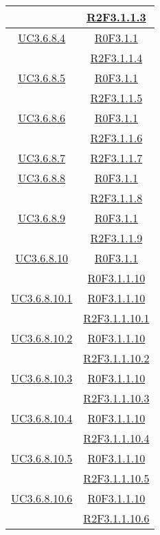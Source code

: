 \begin{longtable}{|c|c|}
& \hyperlink{R2F3.1.1.3}{R2F3.1.1.3}\\
\hline
\hyperlink{UC3.6.8.4}{UC3.6.8.4} & \hyperlink{R0F3.1.1}{R0F3.1.1}\\
& \hyperlink{R2F3.1.1.4}{R2F3.1.1.4}\\
\hline
\hyperlink{UC3.6.8.5}{UC3.6.8.5} & \hyperlink{R0F3.1.1}{R0F3.1.1}\\
& \hyperlink{R2F3.1.1.5}{R2F3.1.1.5}\\
\hline
\hyperlink{UC3.6.8.6}{UC3.6.8.6} & \hyperlink{R0F3.1.1}{R0F3.1.1}\\
& \hyperlink{R2F3.1.1.6}{R2F3.1.1.6}\\
\hline
\hyperlink{UC3.6.8.7}{UC3.6.8.7} & \hyperlink{R2F3.1.1.7}{R2F3.1.1.7}\\
\hline
\hyperlink{UC3.6.8.8}{UC3.6.8.8} & \hyperlink{R0F3.1.1}{R0F3.1.1}\\
& \hyperlink{R2F3.1.1.8}{R2F3.1.1.8}\\
\hline
\hyperlink{UC3.6.8.9}{UC3.6.8.9} & \hyperlink{R0F3.1.1}{R0F3.1.1}\\
& \hyperlink{R2F3.1.1.9}{R2F3.1.1.9}\\
\hline
\hyperlink{UC3.6.8.10}{UC3.6.8.10} & \hyperlink{R0F3.1.1}{R0F3.1.1}\\
& \hyperlink{R0F3.1.1.10}{R0F3.1.1.10}\\
\hline
\hyperlink{UC3.6.8.10.1}{UC3.6.8.10.1} & \hyperlink{R0F3.1.1.10}{R0F3.1.1.10}\\
& \hyperlink{R2F3.1.1.10.1}{R2F3.1.1.10.1}\\
\hline
\hyperlink{UC3.6.8.10.2}{UC3.6.8.10.2} & \hyperlink{R0F3.1.1.10}{R0F3.1.1.10}\\
& \hyperlink{R2F3.1.1.10.2}{R2F3.1.1.10.2}\\
\hline
\hyperlink{UC3.6.8.10.3}{UC3.6.8.10.3} & \hyperlink{R0F3.1.1.10}{R0F3.1.1.10}\\
& \hyperlink{R2F3.1.1.10.3}{R2F3.1.1.10.3}\\
\hline
\hyperlink{UC3.6.8.10.4}{UC3.6.8.10.4} & \hyperlink{R0F3.1.1.10}{R0F3.1.1.10}\\
& \hyperlink{R2F3.1.1.10.4}{R2F3.1.1.10.4}\\
\hline
\hyperlink{UC3.6.8.10.5}{UC3.6.8.10.5} & \hyperlink{R0F3.1.1.10}{R0F3.1.1.10}\\
& \hyperlink{R2F3.1.1.10.5}{R2F3.1.1.10.5}\\
\hline
\hyperlink{UC3.6.8.10.6}{UC3.6.8.10.6} & \hyperlink{R0F3.1.1.10}{R0F3.1.1.10}\\
& \hyperlink{R2F3.1.1.10.6}{R2F3.1.1.10.6}\\

\end{longtable}
